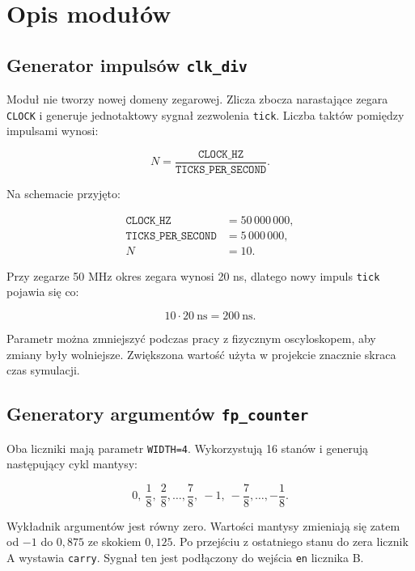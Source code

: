 \documentclass[12pt,a4paper]{article}
\begin{document}
\section{Opis modułów}

\subsection{Generator impulsów \texttt{clk\_div}}

Moduł nie tworzy nowej domeny zegarowej. Zlicza zbocza narastające zegara
\texttt{CLOCK} i generuje jednotaktowy sygnał zezwolenia \texttt{tick}.
Liczba taktów pomiędzy impulsami wynosi:

\begin{equation}
    N = \frac{\texttt{CLOCK\_HZ}}{\texttt{TICKS\_PER\_SECOND}}.
\end{equation}

Na schemacie przyjęto:

\begin{align}
    \texttt{CLOCK\_HZ} &= 50\,000\,000,\\
    \texttt{TICKS\_PER\_SECOND} &= 5\,000\,000,\\
    N &= 10.
\end{align}

Przy zegarze 50 MHz okres zegara wynosi 20 ns, dlatego nowy impuls
\texttt{tick} pojawia się co:

\begin{equation}
    10 \cdot 20\ \text{ns} = 200\ \text{ns}.
\end{equation}

Parametr można zmniejszyć podczas pracy z fizycznym oscyloskopem, aby zmiany
były wolniejsze. Zwiększona wartość użyta w projekcie znacznie skraca czas
symulacji.

\subsection{Generatory argumentów \texttt{fp\_counter}}

Oba liczniki mają parametr \texttt{WIDTH=4}. Wykorzystują 16 stanów i
generują następujący cykl mantysy:

\begin{equation}
0,\ \frac18,\ \frac28,\ldots,\frac78,\ -1,\ -\frac78,\ldots,-\frac18.
\end{equation}

Wykładnik argumentów jest równy zero. Wartości mantysy zmieniają się zatem od
\(-1\) do \(0{,}875\) ze skokiem \(0{,}125\). Po przejściu z ostatniego stanu
do zera licznik A wystawia \texttt{carry}. Sygnał ten jest podłączony do
wejścia \texttt{en} licznika B.
\end{document}
